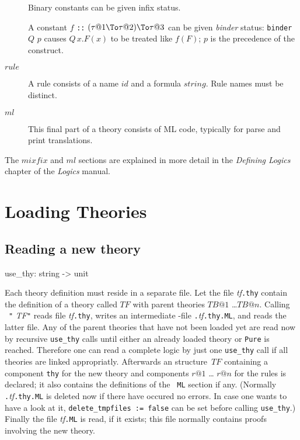 \begin{description}
  Binary constants can be given infix status.

  A constant $f$ {\tt::} $(\tau@1\To\tau@2)\To\tau@3$ can be given {\em
    binder} status: {\tt binder} $Q$ $p$ causes $Q\,x.F(x)$ to be treated
  like $f(F)$; $p$ is the precedence of the construct.
\item[$rule$] A rule consists of a name $id$ and a formula $string$.  Rule
  names must be distinct.
\item[$ml$] This final part of a theory consists of ML code, 
  typically for parse and print translations.
\end{description}
The $mixfix$ and $ml$ sections are explained in more detail in the {\it
Defining Logics} chapter of the {\it Logics} manual.

\section{Loading Theories}
\label{LoadingTheories}
\subsection{Reading a new theory}

\begin{ttbox} 
use_thy: string -> unit
\end{ttbox}

Each theory definition must reside in a separate file.  Let the file {\it
tf}{\tt.thy} contain the definition of a theory called $TF$ with parent
theories $TB@1$ \dots $TB@n$.  Calling ~{\tt"}{\it
TF\/}{\tt"} reads file {\it tf}{\tt.thy}, writes an intermediate {\ML}-file
{\tt.}{\it tf}{\tt.thy.ML}, and reads the latter file.  Any of the parent
theories that have not been loaded yet are read now by recursive {\tt use_thy}
calls until either an already loaded theory or {\tt Pure} is reached.
Therefore one can read a complete logic by just one {\tt use_thy} call if all
theories are linked appropriatly.  Afterwards an {\ML} structure~$TF$
containing a component {\tt thy} for the new theory and components $r@1$ \dots
$r@n$ for the rules is declared; it also contains the definitions of the {\tt
ML} section if any. (Normally {\tt.}{\it tf}{\tt.thy.ML} is deleted now if
there have occured no errors. In case one wants to have a look at it,
{\tt delete_tmpfiles := false} can be set before calling {\tt use_thy}.)  
Finally the file {\it tf}{\tt.ML} is read, if it exists; this file normally
contains proofs involving the new theory.


